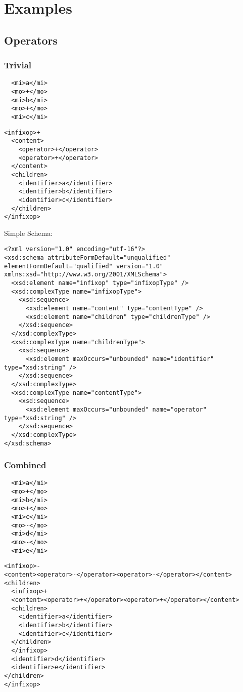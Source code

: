 \documentclass{article}
\begin{document}
\section{Examples}
\label{sec:examples}


\subsection{Operators}
\label{sec:operators}

\subsubsection{Trivial}
\label{sec:trivial-ops}


\begin{lstlisting}
  <mi>a</mi>
  <mo>+</mo>
  <mi>b</mi>
  <mo>+</mo>
  <mi>c</mi>
\end{lstlisting}
\begin{lstlisting}
<infixop>+
  <content>
    <operator>+</operator>
    <operator>+</operator>
  </content>
  <children>
    <identifier>a</identifier>
    <identifier>b</identifier>
    <identifier>c</identifier>
  </children>
</infixop>
\end{lstlisting}



Simple Schema:
\begin{lstlisting}
<?xml version="1.0" encoding="utf-16"?>
<xsd:schema attributeFormDefault="unqualified" elementFormDefault="qualified" version="1.0" xmlns:xsd="http://www.w3.org/2001/XMLSchema">
  <xsd:element name="infixop" type="infixopType" />
  <xsd:complexType name="infixopType">
    <xsd:sequence>
      <xsd:element name="content" type="contentType" />
      <xsd:element name="children" type="childrenType" />
    </xsd:sequence>
  </xsd:complexType>
  <xsd:complexType name="childrenType">
    <xsd:sequence>
      <xsd:element maxOccurs="unbounded" name="identifier" type="xsd:string" />
    </xsd:sequence>
  </xsd:complexType>
  <xsd:complexType name="contentType">
    <xsd:sequence>
      <xsd:element maxOccurs="unbounded" name="operator" type="xsd:string" />
    </xsd:sequence>
  </xsd:complexType>
</xsd:schema>
\end{lstlisting}

\subsubsection{Combined}
\label{sec:combined-ops}


\begin{lstlisting}
  <mi>a</mi>
  <mo>+</mo>
  <mi>b</mi>
  <mo>+</mo>
  <mi>c</mi>
  <mo>-</mo>
  <mi>d</mi>
  <mo>-</mo>
  <mi>e</mi>
\end{lstlisting}
\begin{lstlisting}
<infixop>-
<content><operator>-</operator><operator>-</operator></content>
<children>
  <infixop>+
  <content><operator>+</operator><operator>+</operator></content>
  <children>
    <identifier>a</identifier>
    <identifier>b</identifier>
    <identifier>c</identifier>
  </children>
  </infixop>
  <identifier>d</identifier>
  <identifier>e</identifier>
</children>
</infixop>
\end{lstlisting}
\end{document}
